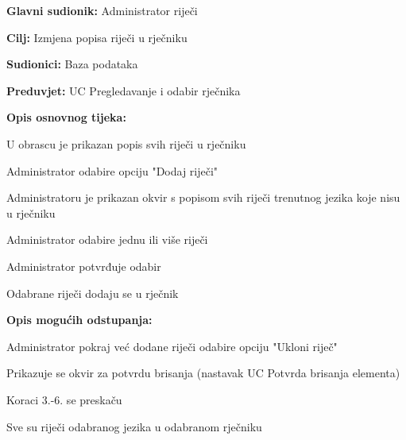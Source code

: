 \noindent {}
\begin{packed_item}

	\item \textbf{Glavni sudionik: } Administrator riječi
	\item \textbf{Cilj: } Izmjena popisa riječi u rječniku
	\item \textbf{Sudionici: } Baza podataka
	\item \textbf{Preduvjet: } UC Pregledavanje i odabir rječnika
	\item  \textbf{Opis osnovnog tijeka:}
	
	\item[] \begin{packed_enum}
		
		\item U obrascu je prikazan popis svih riječi u rječniku
		\item Administrator odabire opciju "Dodaj riječi"
		\item Administratoru je prikazan okvir s popisom svih riječi trenutnog jezika koje nisu u rječniku
		\item Administrator odabire jednu ili više riječi
		\item Administrator potvrđuje odabir
		\item Odabrane riječi dodaju se u rječnik

	\end{packed_enum}

	\item  \textbf{Opis mogućih odstupanja:}
	
	\item[] \begin{packed_item}

		\item[2.a] Administrator pokraj već dodane riječi odabire opciju "Ukloni riječ"
		\item[] \begin{packed_enum}
			
			\item Prikazuje se okvir za potvrdu brisanja (nastavak UC Potvrda brisanja elementa)
			\item Koraci 3.-6. se preskaču
			
		\end{packed_enum}

		\item[3.a] Sve su riječi odabranog jezika u odabranom rječniku
		\item[] \begin{packed_enum}
			

\end{packed_enum}
\end{packed_item}
\end{packed_item}
